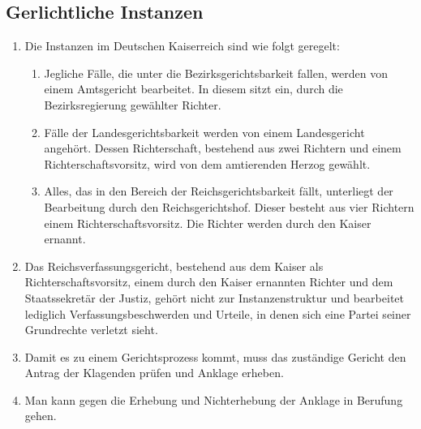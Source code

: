 \documentclass{article}
\begin{document}
\subsection{Gerlichtliche Instanzen}
\begin{enumerate}[(1)]
    \item Die Instanzen im Deutschen Kaiserreich sind wie folgt geregelt:
    \begin{enumerate}[1.]
        \item Jegliche Fälle, die unter die Bezirksgerichtsbarkeit fallen, werden von einem Amtsgericht bearbeitet. In diesem sitzt ein, durch die Bezirksregierung gewählter Richter.
        \item Fälle der Landesgerichtsbarkeit werden von einem Landesgericht angehört. Dessen Richterschaft, bestehend aus zwei Richtern und einem Richterschaftsvorsitz, wird von dem amtierenden Herzog gewählt.
        \item Alles, das in den Bereich der Reichsgerichtsbarkeit fällt, unterliegt der Bearbeitung durch den Reichsgerichtshof. Dieser besteht aus vier Richtern einem Richterschaftsvorsitz. Die Richter werden durch den Kaiser ernannt.
    \end{enumerate}
    \item Das Reichsverfassungsgericht, bestehend aus dem Kaiser als Richterschaftsvorsitz, einem durch den Kaiser ernannten Richter und dem Staatssekretär der Justiz, gehört nicht zur Instanzenstruktur und
    bearbeitet lediglich Verfassungsbeschwerden und Urteile, in denen sich eine Partei seiner Grundrechte verletzt sieht.
    \item Damit es zu einem Gerichtsprozess kommt, muss das zuständige Gericht den Antrag der Klagenden prüfen und Anklage erheben.
    \item Man kann gegen die Erhebung und Nichterhebung der Anklage in Berufung gehen.
\end{enumerate}
\end{document}
